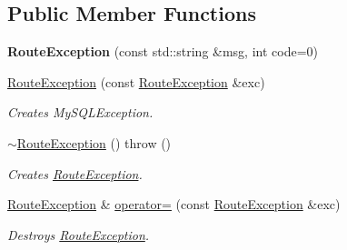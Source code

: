 \subsection*{Public Member Functions}
\begin{DoxyCompactItemize}
\item 
\mbox{\label{classecodtn_1_1net_1_1RouteException_a61440abb4fa31d5b97233bff13f33c71}} 
{\bfseries Route\+Exception} (const std\+::string \&msg, int code=0)
\item 
\mbox{\label{classecodtn_1_1net_1_1RouteException_ae9094b16405fb0f971413e17a103b331}} 
\hyperlink{classecodtn_1_1net_1_1RouteException_ae9094b16405fb0f971413e17a103b331}{Route\+Exception} (const \hyperlink{classecodtn_1_1net_1_1RouteException}{Route\+Exception} \&exc)
\begin{DoxyCompactList}\small\item\em Creates My\+S\+Q\+L\+Exception. \end{DoxyCompactList}\item 
\mbox{\label{classecodtn_1_1net_1_1RouteException_a8a7541dda78efcbc4665d06419c358ac}} 
\hyperlink{classecodtn_1_1net_1_1RouteException_a8a7541dda78efcbc4665d06419c358ac}{$\sim$\+Route\+Exception} ()  throw ()
\begin{DoxyCompactList}\small\item\em Creates \hyperlink{classecodtn_1_1net_1_1RouteException}{Route\+Exception}. \end{DoxyCompactList}\item 
\mbox{\label{classecodtn_1_1net_1_1RouteException_a9f53c17f77c7919c9671ee5c90905e22}} 
\hyperlink{classecodtn_1_1net_1_1RouteException}{Route\+Exception} \& \hyperlink{classecodtn_1_1net_1_1RouteException_a9f53c17f77c7919c9671ee5c90905e22}{operator=} (const \hyperlink{classecodtn_1_1net_1_1RouteException}{Route\+Exception} \&exc)
\begin{DoxyCompactList}\small\item\em Destroys \hyperlink{classecodtn_1_1net_1_1RouteException}{Route\+Exception}. \end{DoxyCompactList}\item 
\mbox{\label{classecodtn_1_1net_1_1RouteException_aa15e125ab1895ae1fc8aee79ffc82175}} 

\end{DoxyCompactItemize}
